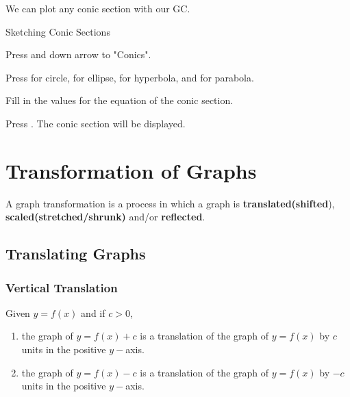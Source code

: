 \documentclass[11pt,a4paper]{book}
\begin{document}
We can plot any conic section with our GC.

\medskip{}

\begin{GC}{Sketching Conic Sections}
\begin{steps}
\item Press  and down arrow to "Conics".
\item Press  for circle,  for ellipse,  for hyperbola, and  for parabola.
\item Fill in the values for the equation of the conic section.
\item Press . The conic section will be displayed.
\end{steps}
\end{GC}

\newpage

\section{Transformation of Graphs}

A graph transformation is a process in which a graph is \textbf{translated(shifted}),
\textbf{scaled(stretched/shrunk)} and/or \textbf{reflected}.

\subsection{Translating Graphs}

\subsubsection{Vertical Translation }

\begin{tcolorbox}[colback=blue!5, colframe=black,boxrule=.4pt, sharpish corners]

Given $y=f\left(x\right)$ and if $c>0$,

\begin{enumerate}[label=(\alph*)]

\item  the graph of $y=f\left(x\right)+c$ is a translation of the
graph of $y=f\left(x\right)$ by $c$ units in the positive $y-$axis.

\item  the graph of $y=f\left(x\right)-c$ is a translation of the
graph of $y=f\left(x\right)$ by $-c$ units in the positive $y-$axis.

\end{enumerate}
\end{tcolorbox}
\end{document}
